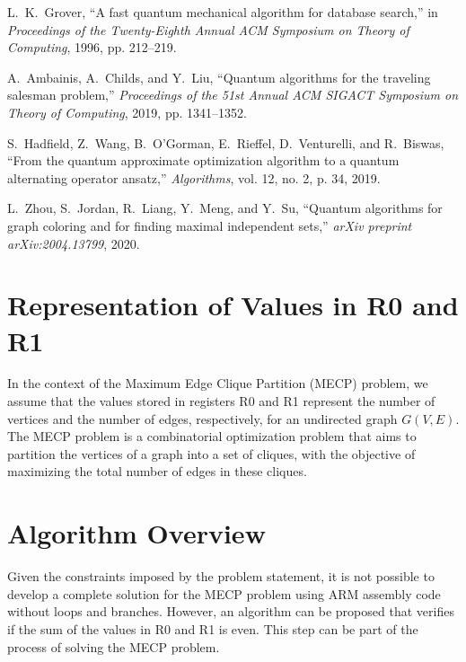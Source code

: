 
\begin{thebibliography}{1}

    L.~K.~Grover, ``A fast quantum mechanical algorithm for database search,'' in \emph{Proceedings of the Twenty-Eighth Annual ACM Symposium on Theory of Computing}, 1996, pp. 212--219.
    
    A.~Ambainis, A.~Childs, and Y.~Liu, ``Quantum algorithms for the traveling salesman problem,'' \emph{Proceedings of the 51st Annual ACM SIGACT Symposium on Theory of Computing}, 2019, pp. 1341--1352.
    
    S.~Hadfield, Z.~Wang, B.~O'Gorman, E.~Rieffel, D.~Venturelli, and R.~Biswas, ``From the quantum approximate optimization algorithm to a quantum alternating operator ansatz,'' \emph{Algorithms}, vol. 12, no. 2, p. 34, 2019.
    
    L.~Zhou, S.~Jordan, R.~Liang, Y.~Meng, and Y.~Su, ``Quantum algorithms for graph coloring and for finding maximal independent sets,'' \emph{arXiv preprint arXiv:2004.13799}, 2020.

\end{thebibliography}

\section{Representation of Values in R0 and R1}

In the context of the Maximum Edge Clique Partition (MECP) problem, we assume that the values stored in registers R0 and R1 represent the number of vertices and the number of edges, respectively, for an undirected graph $G(V,E)$. The MECP problem is a combinatorial optimization problem that aims to partition the vertices of a graph into a set of cliques, with the objective of maximizing the total number of edges in these cliques.

\section{Algorithm Overview}

Given the constraints imposed by the problem statement, it is not possible to develop a complete solution for the MECP problem using ARM assembly code without loops and branches. However, an algorithm can be proposed that verifies if the sum of the values in R0 and R1 is even. This step can be part of the process of solving the MECP problem.

